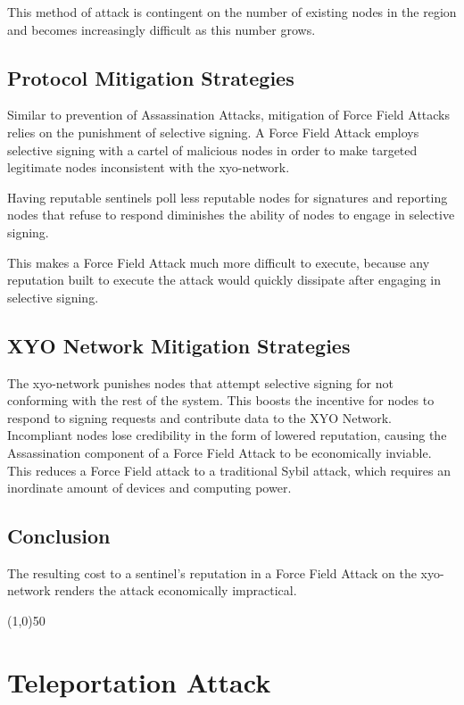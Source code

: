 \documentclass{article}
\begin{document}
This method of attack is contingent on the number of existing nodes in the region and becomes increasingly difficult as this number grows.

\subsection{Protocol Mitigation Strategies}

Similar to prevention of Assassination Attacks, mitigation of Force Field Attacks relies on the punishment of selective signing. A Force Field Attack employs selective signing with a cartel of malicious nodes in order to make targeted legitimate nodes inconsistent with the \Gls{xyo-network}. 

Having reputable \Glspl{sentinel} poll less reputable nodes for signatures and reporting nodes that refuse to respond diminishes the ability of nodes to engage in selective signing.

This makes a Force Field Attack much more difficult to execute, because any reputation built to execute the attack would quickly dissipate after engaging in selective signing.

\subsection{XYO Network Mitigation Strategies}

The \Gls{xyo-network} punishes nodes that attempt selective signing for not conforming with the rest of the system. This boosts the incentive for nodes to respond to signing requests and contribute data to the XYO Network. Incompliant nodes lose credibility in the form of lowered reputation, causing the Assassination component of a Force Field Attack to be economically inviable. This reduces a Force Field attack to a traditional Sybil attack, which requires an inordinate amount of devices and computing power.

\subsection{Conclusion}

The resulting cost to a \Gls{sentinel}'s reputation in a Force Field Attack on the \Gls{xyo-network} renders the attack economically impractical.

\begin{center}
\line(1,0){50}
\end{center}

\section{Teleportation Attack}
\end{document}
